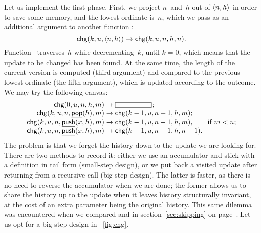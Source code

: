 Let us implement the first phase. First, we project \(n\)~and~\(h\)
out of \(\langle{n},{h}\rangle\) in order to save some memory, and the lowest
ordinate is~\(n\), which we pass as an additional argument to another
function :
\begin{equation*}
\textsf{chg}(k,u,\langle{n},{h}\rangle) \rightarrow \textsf{chg}(k,u,n,h,n).
\end{equation*}
Function~ traverses~\(h\) while decrementing~\(k\), until
\(k=0\), which means that the update to be changed has been found. At
the same time, the length of the current version is computed (third
argument) and compared to the previous lowest ordinate (the fifth
argument), which is updated according to the outcome. We may try the
following canvas:
\begin{equation*}
\begin{array}{@{}r@{\;}l@{\;}l@{}}
\fun{chg}(0,u,n,h,m) & \rightarrow & \fbcode{CCCCCCC}\,;\\
\fun{chg}(k,u,n,\ufun{pop}(h),m) & \rightarrow
                                 & \fun{chg}(k-1,u,n+1,h,m);\\
\fun{chg}(k,u,n,\ufun{push}(x,h),m) & \rightarrow 
                   & \fun{chg}(k-1,u,n-1,h,m),\qquad \text{if \(m < n\)};\\
\fun{chg}(k,u,n,\ufun{push}(x,h),m) & \rightarrow
                                    & \fun{chg}(k-1,u,n-1,h,n-1).
\end{array}
\end{equation*}
 The problem is that we forget the history
down to the update we are looking for. There are two methods to record
it: either we use an accumulator and stick with a definition in tail
form (small\hyp{}step
design), or we put back a visited
update after returning from a recursive call (big\hyp{}step
design). The latter is faster, as there
is no need to reverse the accumulator when we are done; the former
allows us to share the history up to the update when it leaves history
structurally invariant, at the cost of an extra parameter being the
original history. This same dilemma was encountered when we compared
 and
 in
section~\ref{sec:skipping} on page~\pageref{sec:skipping}. Let us opt
for a big\hyp{}step design in \fig~\ref{fig:chg}.
